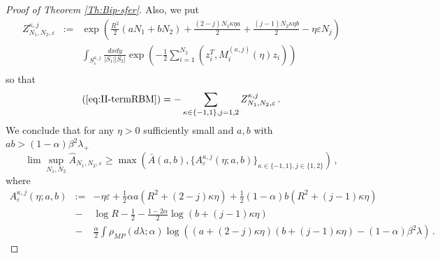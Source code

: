 \documentclass[10pt,oneside,a4paper,reqno]{amsart}  %
\def\be{\begin{equation}}
\def\ee{\end{equation}}
\def\bea{\begin{eqnarray}}
\def\eea{\end{eqnarray}}
\def\nn{\nonumber}
\DeclareMathOperator{\diag}{diag}
\def\a{\alpha}
\def\e{\varepsilon}
\def\b{\beta}
\def\l{\lambda}
\def\r{\rho}
\def\s{\sigma}
\def\R{\mathbb{R}}
\theoremstyle{plain}
\numberwithin{equation}{section}
\newcommand{\pecetta}[1]{
$\phantom .$
\bigskip
\par\noindent
\colorbox{light}{\begin{minipage}{12cm}#1\end{minipage}}
\bigskip
\par\noindent
}
\begin{document}
\begin{proof}[Proof of Theorem \ref{Th:Bip-sfer}]


Also, we put
\bea
Z_{N_1,N_2,\e}^{\kappa,j}&:=& \exp\left(\frac {R^2}{2} (aN_1+b N_2)+\frac{(2-j)N_1\kappa\eta a}{2}+\frac{(j-1)N_2\kappa\eta b}{2}-\eta \e N_j\right)\nn\\
&&\int_{S_\e^{\kappa,j}} \frac{dxdy}{|S_1||S_2|}\exp\left( -\frac 1 2 \sum_{i=1}^{N_2} (z_i^T,M^{(\kappa,j)}_i(\eta) z_i)\right)\nn\\
\eea
so that 
$$
(\ref{eq:II-termRBM})=-\sum_{\kappa\in\{-1,1\},j=1,2} Z_{N_1,N_2,\e}^{\kappa,j}\,. 
$$
We conclude that for any $\eta>0$ sufficiently small and $a,b$ with $ab>(1-\a)\b^2\l_+$ 
\be
\lim\sup_{N_1,N_2} \widehat A_{N_1,N_2,\e}\geq \max(\bar A(a,b), \{A_\e^{\kappa, j}(\eta; a,b)\}_{\kappa\in\{-1,1\},j\in\{1,2\}})\,,
\ee
where 
\bea
A_\e^{\kappa,j}(\eta; a,b)&:=&-\eta\e+\frac12\a a(R^2+(2-j)\kappa\eta)+\frac12(1-\a) b(R^2+(j-1)\kappa\eta)\nn\\
&-&\log R -\frac12-\frac{1-2\a}{2}\log (b+(j-1)\kappa\eta)\nn\\
&-&\frac\a2 \int \r_{MP}(d\l;\a)\log((a+(2-j)\kappa\eta)(b+(j-1)\kappa\eta)- (1-\a)\b^2\l)\,. \nn
\eea


\end{proof}
\end{document}
